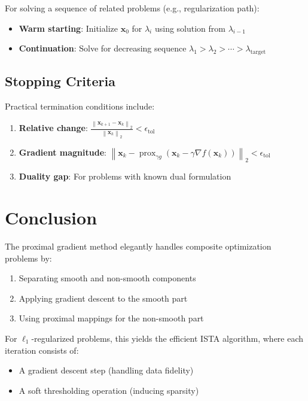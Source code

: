 \documentclass[12pt]{article}
\renewcommand{\vec}[1]{\mathbf{#1}}
\DeclareMathOperator{\prox}{prox}
\newcommand{\norm}[1]{\left\lVert#1\right\rVert}
\theoremstyle{definition}
\begin{document}
For solving a sequence of related problems (e.g., regularization path):
\begin{itemize}
    \item \textbf{Warm starting}: Initialize $\vec{x}_0$ for $\lambda_i$ using solution from $\lambda_{i-1}$
    \item \textbf{Continuation}: Solve for decreasing sequence $\lambda_1 > \lambda_2 > \cdots > \lambda_{\text{target}}$
\end{itemize}

\subsection{Stopping Criteria}

Practical termination conditions include:
\begin{enumerate}
    \item \textbf{Relative change}: $\frac{\norm{\vec{x}_{k+1} - \vec{x}_k}_2}{\norm{\vec{x}_k}_2} < \epsilon_{\text{tol}}$
    \item \textbf{Gradient magnitude}: $\norm{\vec{x}_k - \prox_{\gamma g}(\vec{x}_k - \gamma\nabla f(\vec{x}_k))}_2 < \epsilon_{\text{tol}}$
    \item \textbf{Duality gap}: For problems with known dual formulation
\end{enumerate}

\section{Conclusion}

The proximal gradient method elegantly handles composite optimization problems by:
\begin{enumerate}
    \item Separating smooth and non-smooth components
    \item Applying gradient descent to the smooth part
    \item Using proximal mappings for the non-smooth part
\end{enumerate}

For $\ell_1$-regularized problems, this yields the efficient ISTA algorithm, where each iteration consists of:
\begin{itemize}
    \item A gradient descent step (handling data fidelity)
    \item A soft thresholding operation (inducing sparsity)
\end{itemize}
\end{document}
